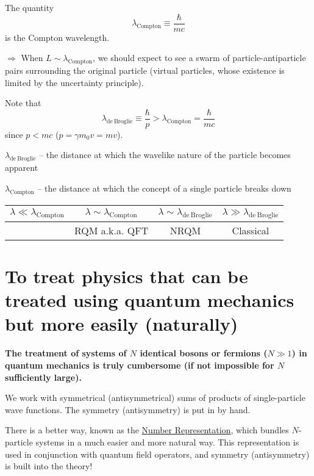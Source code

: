 \documentclass{article}
\begin{document}
\noindent The quantity
\begin{equation*}
\lambda_\mathrm{Compton} \equiv \dfrac{\hbar}{mc}
\end{equation*}
is the Compton wavelength.

\noindent $\Rightarrow$ When $ L \sim \lambda_\mathrm{Compton} $, we should expect to see a swarm of particle-antiparticle pairs surrounding the original particle (virtual particles, whose existence is limited by the uncertainty principle).

\noindent Note that
\begin{equation*}
\lambda_\mathrm{de~Broglie} \equiv \dfrac{\hbar}{p} > \lambda_\mathrm{Compton} = \dfrac{\hbar}{mc}
\end{equation*}
since $ p < m c $ ($ p = \gamma m_0 v = m v $).

\noindent $\lambda_\mathrm{de~Broglie}$ -- the distance at which the wavelike nature of the particle becomes apparent


\noindent $\lambda_\mathrm{Compton}$ -- the distance at which the concept of a single particle breaks down

\begin{center}
\begin{tabular}{|c|c|c|c|}
\hline 
$\lambda \ll \lambda_\mathrm{Compton}$ & $\lambda \sim \lambda_\mathrm{Compton}$ & $\lambda \sim \lambda_\mathrm{de~Broglie}$ & $\lambda \gg \lambda_\mathrm{de~Broglie}$ \\ 
\hline
& RQM a.k.a. QFT & NRQM & Classical \\
\hline
\end{tabular} 
\end{center}

\section{To treat physics that can be treated using quantum mechanics but more easily (naturally)}

\noindent \textbf{The treatment of systems of $N$ identical bosons or fermions ($ N \gg 1 $) in quantum mechanics is truly cumbersome (if not impossible for $N$ sufficiently large).}

\noindent We work with symmetrical (antisymmetrical) sums of products of single-particle wave functions. The symmetry (antisymmetry) is put in by hand.

\noindent There is a better way, known as the \underline{Number Representation}, which bundles $N$-particle systems in a much easier and more natural way. This representation is used in conjunction with quantum field operators, and symmetry (antisymmetry) is built into the theory!
\end{document}
